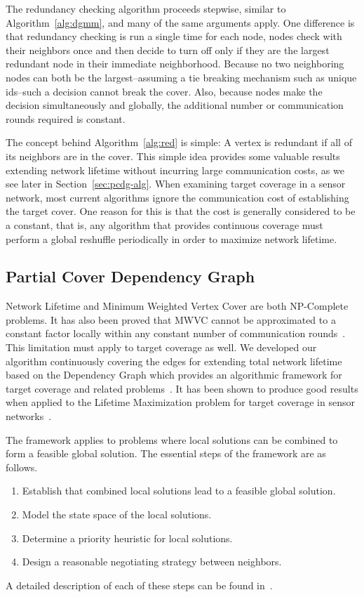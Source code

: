  



The redundancy checking algorithm proceeds stepwise, similar to Algorithm~\ref{alg:dgmm}, and many of the same arguments apply. One difference is that redundancy checking is run a single time for each node, nodes check with their neighbors once and then decide to turn off only if they are the largest redundant node in their immediate neighborhood. Because no two neighboring nodes can both be the largest--assuming a tie breaking mechanism such as unique ids--such a decision cannot break the cover. Also, because nodes make the decision simultaneously and globally, the additional number or communication rounds required is constant.

The concept behind Algorithm~\ref{alg:red} is simple: A vertex is redundant if all of its neighbors are in the cover. This simple idea provides some valuable results extending network lifetime without incurring large communication costs, as we see later in Section~\ref{sec:pcdg-alg}. When examining target coverage in a sensor network, most current algorithms ignore the communication cost of establishing the target cover\cite{1514028}. One reason for this is that the cost is generally considered to be a constant, that is, any algorithm that provides continuous coverage must perform a global reshuffle periodically in order to maximize network lifetime. 

\subsection{Partial Cover Dependency Graph}
\label{sec:life-depend}
Network Lifetime and Minimum Weighted Vertex Cover are both NP-Complete problems. It has also been proved that MWVC cannot be approximated to a constant factor locally within any constant number of communication rounds~\cite{1011811}. This limitation must apply to target coverage as well. We developed our algorithm continuously covering the edges for extending total network lifetime based on the Dependency Graph which provides an algorithmic framework for target coverage and related problems~\cite{IPDPS.2008.45361}. It has been shown to produce good results when applied to the Lifetime Maximization problem for target coverage in sensor networks~\cite{978-3-540-89894-8_26}.

The framework applies to problems where local solutions can be combined to form a feasible global solution. The essential steps of the framework are as follows. 
\begin{enumerate}
\item Establish that combined local solutions lead to a feasible global solution.
\item Model the state space of the local solutions.
\item Determine a priority heuristic for local solutions.
\item Design a reasonable negotiating strategy between neighbors.
\end{enumerate} 
A detailed description of each of these steps can be found in~\cite{IPDPS.2008.45361}.

